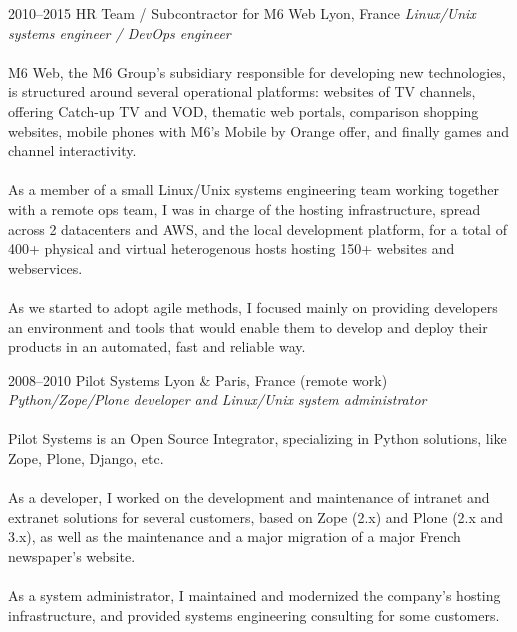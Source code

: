 \documentclass[]{friggeri-cv}
\begin{document}
\begin{entrylist}
  \entry
    {2010--2015}
    {HR Team / Subcontractor for M6 Web}
    {Lyon, France}
    {
      \textit{Linux/Unix systems engineer / DevOps engineer} \\
      \\
      M6 Web, the M6 Group’s subsidiary responsible for developing new
      technologies, is structured around several operational platforms:
      websites of TV channels, offering Catch-up TV and VOD, thematic web
      portals, comparison shopping websites, mobile phones with M6’s Mobile by
      Orange offer, and finally games and channel interactivity. \\
      \\
      As a member of a small Linux/Unix systems engineering team working
      together with a remote ops team, I was in charge of the hosting
      infrastructure, spread across 2 datacenters and AWS, and the local
      development platform, for a total of 400+ physical and virtual
      heterogenous hosts hosting 150+ websites and webservices. \\
      \\
      As we started to adopt agile methods, I focused mainly on providing
      developers an environment and tools that would enable them to develop and
      deploy their products in an automated, fast and reliable way.
    }

  \entry
    {2008--2010}
    {Pilot Systems}
    {Lyon \& Paris, France (remote work)}
    {
        \textit{Python/Zope/Plone developer and Linux/Unix system
                administrator} \\
        \\
        Pilot Systems is an Open Source Integrator, specializing in Python
        solutions, like Zope, Plone, Django, etc. \\
        \\
        As a developer, I worked on the development and maintenance of intranet
        and extranet solutions for several customers, based on Zope (2.x) and
        Plone (2.x and 3.x), as well as the maintenance and a major migration
        of a major French newspaper's website. \\
        \\
        As a system administrator, I maintained and modernized the company's
        hosting infrastructure, and provided systems engineering consulting for
        some customers.
    }


\end{entrylist}
\end{document}
